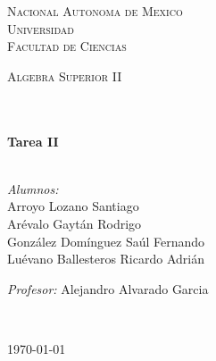 \begin{center}
\begin{minipage}{0.48\textwidth}
\begin{flushright}
        \end{flushright}
    \end{minipage}
    \vspace*{-1.5cm}						
    \textsc{\huge Nacional Autonoma de Mexico \\ \vspace{-4px} Universidad }\\[2cm]	
    \textsc{\LARGE Facultad de Ciencias}\\[1.5cm]
    \begin{minipage}{0.9\textwidth} 
        \begin{center}
            \textsc{\LARGE Algebra Superior II}
        \end{center}
    \end{minipage}\\[0.5cm]
    \vspace*{1cm}					
        \HRule \\[0.4cm]							
            { \huge \bfseries Tarea II}\\[0.4cm]	
        \HRule \\[1.5cm]						
    \begin{minipage}{0.46\textwidth}													
        \begin{flushleft} \large						\small								
            \emph{Alumnos:}\\	
           Arroyo Lozano Santiago \\ 
           Arévalo Gaytán Rodrigo \\
           González Domínguez Saúl Fernando \\
           Luévano Ballesteros Ricardo Adrián
            \vspace*{2cm}	
        \end{flushleft}																		
    \end{minipage}		
    \begin{minipage}{0.52\textwidth}		
        \vspace{-0.6cm}											
        \begin{flushright} \large						\small										
            \emph{Profesor:} 
           Alejandro Alvarado Garcia\\											
        \end{flushright}																	
    \end{minipage}	
    \vspace*{1cm}
    \\
    \vspace{2cm}
    \begin{center}						
        {\large \today}
    \end{center}  						
\end{center}	
\newpage	